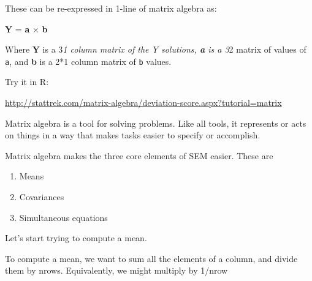 \documentclass[11pt,]{article}
\newenvironment{Shaded}{\begin{snugshade}}{\end{snugshade}}
\newcommand{\KeywordTok}[1]{\textcolor[rgb]{0.13,0.29,0.53}{\textbf{#1}}}
\newcommand{\DataTypeTok}[1]{\textcolor[rgb]{0.13,0.29,0.53}{#1}}
\newcommand{\DecValTok}[1]{\textcolor[rgb]{0.00,0.00,0.81}{#1}}
\newcommand{\StringTok}[1]{\textcolor[rgb]{0.31,0.60,0.02}{#1}}
\newcommand{\OtherTok}[1]{\textcolor[rgb]{0.56,0.35,0.01}{#1}}
\newcommand{\OperatorTok}[1]{\textcolor[rgb]{0.81,0.36,0.00}{\textbf{#1}}}
\newcommand{\NormalTok}[1]{#1}
\providecommand{\tightlist}{%
\setlength{\itemsep}{0pt}\setlength{\parskip}{0pt}}
\begin{document}
These can be re-expressed in 1-line of matrix algebra as:

\textbf{Y} = \textbf{a} × \textbf{b}

Where \textbf{Y} is a 3\emph{1 column matrix of the Y solutions,
\textbf{a} is a 3}2 matrix of values of \texttt{a}, and \textbf{b} is a
2*1 column matrix of \texttt{b} values.

Try it in R:

\begin{Shaded}
\end{Shaded}

\url{http://stattrek.com/matrix-algebra/deviation-score.aspx?tutorial=matrix}

Matrix algebra is a tool for solving problems. Like all tools, it
represents or acts on things in a way that makes tasks easier to specify
or accomplish.

Matrix algebra makes the three core elements of SEM easier. These are

\begin{enumerate}
\def\labelenumi{\arabic{enumi}.}
\tightlist
\item
  Means
\item
  Covariances
\item
  Simultaneous equations
\end{enumerate}

Let's start trying to compute a mean.

To compute a mean, we want to sum all the elements of a column, and
divide them by nrows. Equivalently, we might multiply by 1/nrow
\end{document}
